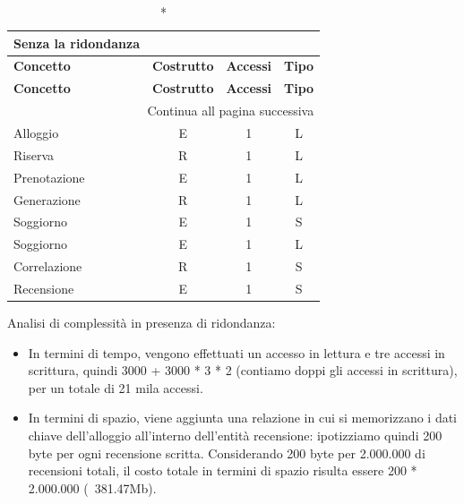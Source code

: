 \small
\setlength\extrarowheight{2pt}
\begin{longtable}{|lccc|}
      \caption*{Senza la ridondanza}                                                   \\

      \hline \textbf{Concetto} & \textbf{Costrutto} & \textbf{Accessi} & \textbf{Tipo} \\\hline
      \endfirsthead

      \hline \textbf{Concetto} & \textbf{Costrutto} & \textbf{Accessi} & \textbf{Tipo} \\\hline
      \endhead

      \hline \multicolumn{4}{|r|}{{Continua all pagina successiva}}                    \\\hline
      \endfoot

      \hline
      \endlastfoot
      Alloggio                 & E                  & 1                & L             \\%
      Riserva                  & R                  & 1                & L             \\%
      Prenotazione             & E                  & 1                & L             \\%
      Generazione              & R                  & 1                & L             \\%
      Soggiorno                & E                  & 1                & S             \\%
      Soggiorno                & E                  & 1                & L             \\%
      Correlazione             & R                  & 1                & S             \\%
      Recensione               & E                  & 1                & S             \\%
\end{longtable}
\normalsize


% 
% 
% 
%

Analisi di complessità in presenza di ridondanza:
\begin{itemize}
      \item In termini di tempo, vengono effettuati un accesso in lettura e tre accessi in scrittura, quindi 3000 + 3000 * 3 * 2 (contiamo doppi gli accessi in scrittura), per un totale di 21 mila accessi.
      \item In termini di spazio, viene aggiunta una relazione in cui si memorizzano i dati chiave dell'alloggio all'interno dell'entità recensione: ipotizziamo quindi 200 byte per ogni recensione scritta.
            Considerando 200 byte per 2.000.000 di recensioni totali, il costo totale in termini di spazio risulta essere 200 * 2.000.000 (~381.47Mb).
\end{itemize}


